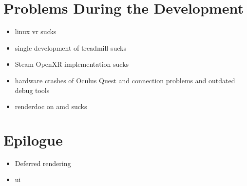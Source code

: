 \label{sec:problems}
\section{Problems During the Development}
\begin{itemize}
    \item linux vr sucks
    \item single development of treadmill sucks
    \item Steam OpenXR implementation sucks
    \item hardware crashes of Oculus Quest and connection problems and outdated debug tools
    \item renderdoc on amd sucks
\end{itemize}
\section{Epilogue}
\begin{itemize}
    \item Deferred rendering
    \item ui
\end{itemize}
